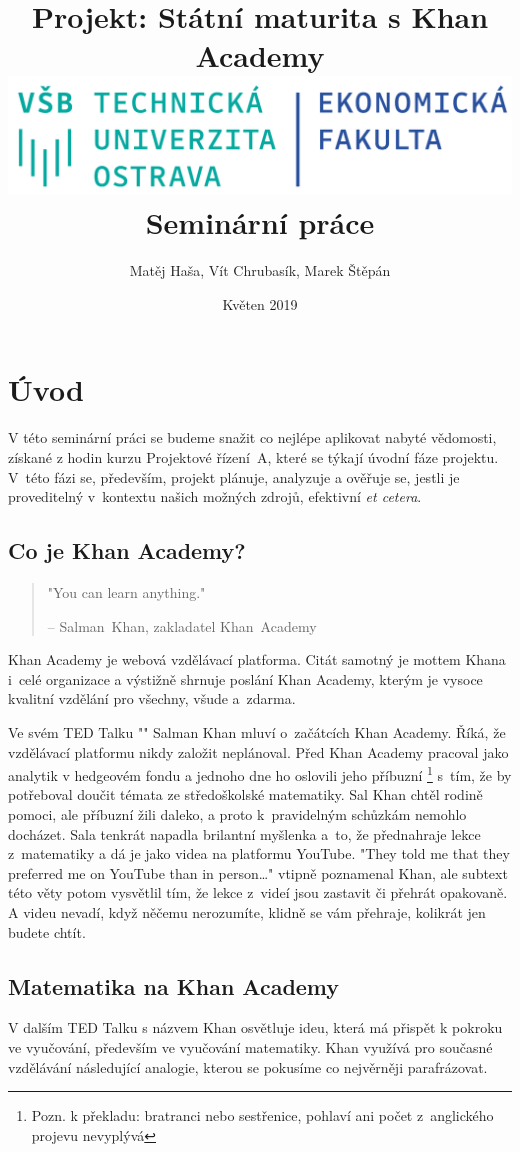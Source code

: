 \documentclass[12pt, a4paper]{report}
\author{Matěj Haša, Vít Chrubasík, Marek Štěpán}
\date{Květen 2019}
\title{Projekt: Státní maturita s Khan Academy\\\medskip
\large \includegraphics[width=\linewidth]{./images/skola_logo.png} Seminární práce}
\begin{document}
\maketitle
\tableofcontents
\listoftables
\listoffigures
\thispagestyle{empty}



\chapter{Úvod}
\label{sec:org0076be4}
V této seminární práci se budeme snažit co nejlépe aplikovat nabyté vědomosti,
získané z hodin kurzu Projektové řízení A, které se týkají úvodní fáze projektu.
V této fázi se, především, projekt plánuje, analyzuje a ověřuje se, jestli je
proveditelný v kontextu našich možných zdrojů, efektivní \emph{et cetera}.

\section{Co je Khan Academy?}
\label{sec:org4120916}
\label{quote:khan}
\begin{quote}
"You can learn anything."

-- Salman Khan, zakladatel Khan Academy
\end{quote}

Khan Academy je webová vzdělávací platforma. Citát samotný je mottem Khana i celé
organizace a výstižně shrnuje poslání Khan Academy, kterým je vysoce kvalitní
vzdělání pro všechny, všude a zdarma.

Ve svém TED Talku "" Salman Khan mluví o začátcích Khan
Academy. Říká, že vzdělávací platformu nikdy založit neplánoval. Před Khan
Academy pracoval jako analytik v hedgeovém fondu a jednoho dne ho oslovili jeho
příbuzní \footnote{Pozn. k překladu: bratranci nebo sestřenice, pohlaví ani počet
z anglického projevu nevyplývá} s tím, že by potřeboval doučit témata ze
středoškolské matematiky. Sal Khan chtěl rodině pomoci, ale příbuzní žili
daleko, a proto k pravidelným schůzkám nemohlo docházet. Sala tenkrát napadla
brilantní myšlenka a to, že přednahraje lekce z matematiky a dá je jako videa na
platformu YouTube. "They told me that they preferred me on YouTube than in
person\ldots{}" vtipně poznamenal Khan, ale subtext této věty potom vysvětlil tím, že
lekce z videí jsou zastavit či přehrát opakovaně. A videu nevadí, když něčemu
nerozumíte, klidně se vám přehraje, kolikrát jen budete chtít.

\section{Matematika na Khan Academy}
\label{sec:org88acbf5}
V dalším TED Talku s názvem  Khan osvětluje ideu, která má
přispět k pokroku ve vyučování, především ve vyučování matematiky. Khan využívá
pro současné vzdělávání následující analogie, kterou se pokusíme co nejvěrněji
parafrázovat.
\end{document}
